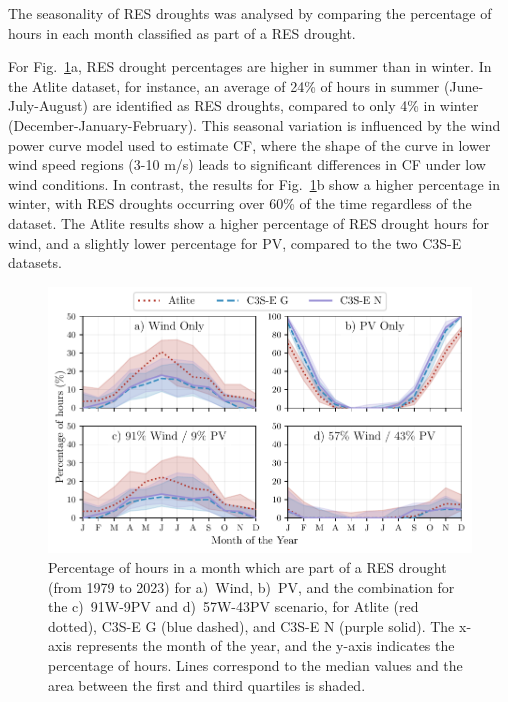 \documentclass[preprint, 12pt, authoryear]{elsarticle}
\begin{document}
The seasonality of RES droughts was analysed by comparing the percentage of hours in each month classified as part of a RES drought. 

For Fig.~\ref{fig:res_droughts_seasonality}a, RES drought percentages are higher in summer than in winter. In the Atlite dataset, for instance, an average of 24\% of hours in summer (June-July-August) are identified as RES droughts, compared to only 4\% in winter (December-January-February). This seasonal variation is influenced by the wind power curve model used to estimate CF, where the shape of the curve in lower wind speed regions (3-10 m/s) leads to significant differences in CF under low wind conditions. In contrast, the results for Fig.~\ref{fig:res_droughts_seasonality}b show a higher percentage in winter, with RES droughts occurring over 60\% of the time regardless of the dataset. The Atlite results show a higher percentage of RES drought hours for wind, and a slightly lower percentage for PV, compared to the two C3S-E datasets. 

\begin{figure}[!ht]
	\centering
	\includegraphics[width=\textwidth]{droughts_seasonality.pdf}
	\caption{Percentage of hours in a month which are part of a RES drought (from 1979 to 2023) for a)~Wind, b)~PV, and the combination for the c)~91W-9PV and d)~57W-43PV scenario, for Atlite (red dotted), C3S-E G (blue dashed), and C3S-E N (purple solid). The x-axis represents the month of the year, and the y-axis indicates the percentage of hours. Lines correspond to the median values and the area between the first and third quartiles is shaded.}
	\label{fig:res_droughts_seasonality}
\end{figure}
\end{document}
